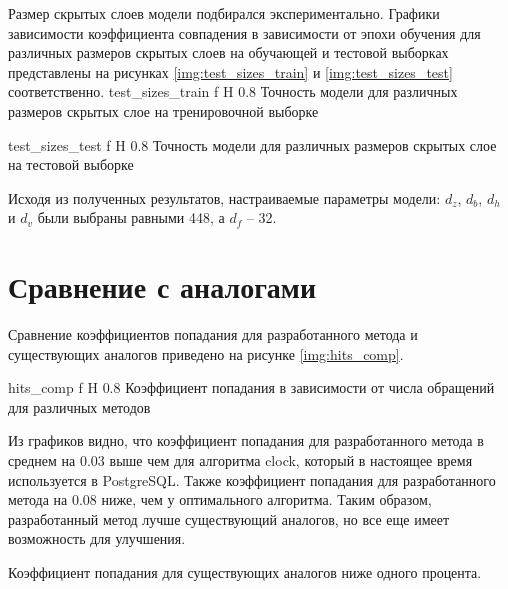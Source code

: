 Размер скрытых слоев модели подбирался экспериментально.
Графики зависимости коэффициента совпадения в зависимости от эпохи обучения для различных размеров скрытых слоев на обучающей и тестовой выборках представлены на рисунках \ref{img:test_sizes_train} и \ref{img:test_sizes_test} соответственно.
{test_sizes_train} %
{f} %
{H} %
{0.8\textwidth} %
{Точность модели для различных размеров скрытых слое на тренировочной выборке} %

{test_sizes_test} %
{f} %
{H} %
{0.8\textwidth} %
{Точность модели для различных размеров скрытых слое на тестовой выборке} %

Исходя из полученных результатов, настраиваемые параметры модели: $d_z$, $d_b$, $d_h$ и $d_v$ были выбраны равными 448, а $d_f$ -- 32.

\section{Сравнение с аналогами}
Сравнение коэффициентов попадания для разработанного метода и существующих аналогов приведено на рисунке \ref{img:hits_comp}.

{hits_comp} %
{f} %
{H} %
{0.8\textwidth} %
{Коэффициент попадания в зависимости от числа обращений для различных методов} %

Из графиков видно, что коэффициент попадания для разработанного метода в среднем на 0.03 выше чем для алгоритма clock, который в настоящее время используется в PostgreSQL.
Также коэффициент попадания для разработанного метода на 0.08 ниже, чем у оптимального алгоритма.
Таким образом, разработанный метод лучше существующий аналогов, но все еще имеет возможность для улучшения.

Коэффициент попадания для существующих аналогов ниже одного процента.
